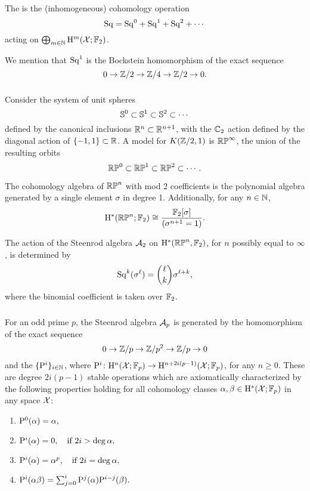The  is the (inhomogeneous) cohomology operation
\[
\mathrm{Sq} = \mathrm{Sq}^0 + \mathrm{Sq}^1 + \mathrm{Sq}^2 + \dotsb
\]
acting on \(\bigoplus_{m \in \mathbb{N}} \mathrm{H}^m(\mathcal{X}; {\mathbb{F}_2})\).

We mention that $\mathrm{Sq}^1$ is the Bockstein homomorphism of the exact sequence
\[
0 \to \mathbb{Z}/2 \to \mathbb{Z}/4 \to \mathbb{Z}/2 \to 0.
\]

\subsubsection{}\label{sss:cohomology_rpn}

Consider the system of unit spheres
\[
\mathbb{S}^0 \subset \mathbb{S}^1 \subset \mathbb{S}^2 \subset \dotsb
\]
defined by the canonical inclusions \(\mathbb{R}^n \subset \mathbb{R}^{n+1}\), with the \(\mathbb{C}_2\) action defined by the diagonal action of \(\{-1,1\} \subset \mathbb{R}\).
A model for \(K(\mathbb{Z}/2, 1)\) is \(\mathbb{RP}^\infty\), the union of the resulting orbits
\[
\mathbb{RP}^0 \subset \mathbb{RP}^1 \subset \mathbb{RP}^2 \subset \dotsb.
\]

The cohomology algebra of $\mathbb{RP}^n$ with mod 2 coefficients is the polynomial algebra generated by a single element $\sigma$ in degree 1.
Additionally, for any $n \in \mathbb{N}$,
\[
\mathrm{H}^\ast(\mathbb{RP}^n; {\mathbb{F}_2}) \cong \frac{{\mathbb{F}_2}[\sigma]}{(\sigma^{n+1} = 1)}.
\]

The action of the Steenrod algebra $\mathcal{A}_2$ on $\mathrm{H}^*(\mathbb{RP}^n, {\mathbb{F}_2})$, for $n$ possibly equal to $\infty$, is determined by
\[
\mathrm{Sq}^k(\sigma^\ell) = \binom{\ell}{k}\sigma^{\ell+k},
\]
where the binomial coefficient is taken over \({\mathbb{F}_2}\).

\subsubsection{}\label{sss:steenrod_odd}

For an odd prime \(p\), the Steenrod algebra $\mathcal{A}_p$ is generated by the  homomorphism of the exact sequence
\[
0 \to \mathbb{Z}/p \to \mathbb{Z}/p^2 \to \mathbb{Z}/p \to 0
\]
and the  \(\{\mathrm{P}^i\}_{i \in \mathbb{N}}\), where $\mathrm{P}^i \colon \mathrm{H}^n(\mathcal{X}; {\mathbb{F}_p}) \to \mathrm{H}^{n+2i(p-1)}(\mathcal{X}; {\mathbb{F}_p})$, for any $n\geq 0$.
These are degree \(2i(p-1)\) stable operations which are axiomatically characterized by the following properties holding for all cohomology classes \(\alpha, \beta \in \mathrm{H}^*(\mathcal{X}; {\mathbb{F}_p})\) in any space \(\mathcal{X}\):

\begin{enumerate}
	\item \(\mathrm{P}^0(\alpha) = \alpha,\)
	\item \(\mathrm{P}^i(\alpha) = 0, \quad \text{if } 2i > \deg\alpha,\)
	\item \(\mathrm{P}^i(\alpha) = \alpha^p, \quad \text{if } 2i = \deg\alpha,\)
	\item \(\mathrm{P}^i(\alpha \beta) = \textstyle\sum_{j=0}^{i} \mathrm{P}^j(\alpha) \mathrm{P}^{i-j}(\beta).\)
\end{enumerate}

